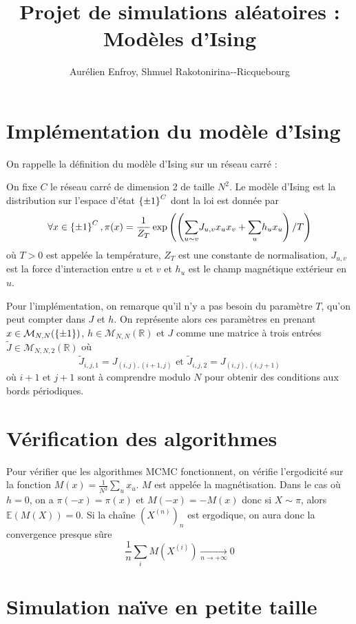 \documentclass[a4paper,11pt]{article}
\title{Projet de simulations aléatoires : Modèles d'Ising}
\author{Aurélien Enfroy, Shmuel Rakotonirina{-}-Ricquebourg}
\begin{document}
\maketitle

\section{Implémentation du modèle d'Ising}

On rappelle la définition du modèle d'Ising sur un réseau carré :
\begin{definition}
On fixe $C$ le réseau carré de dimension 2 de taille $N^2$. Le modèle d'Ising est la distribution sur l'espace d'état $\left\lbrace \pm 1 \right\rbrace^C$ dont la loi est donnée par
$$\forall x \in \left\lbrace \pm 1 \right\rbrace^C, \pi(x) = \frac{1}{Z_T} \exp \left(\left( \displaystyle{\sum_{u\sim v}^{}} J_{u,v} x_{u} x_{v} + \displaystyle{\sum_{u}^{}} h_{u} x_{u} \right)/T\right)$$
où $T>0$ est appelée la température, $Z_T$ est une constante de normalisation, $J_{u,v}$ est la force d'interaction entre $u$ et $v$ et $h_{u}$ est le champ magnétique extérieur en $u$.
\end{definition}

Pour l'implémentation, on remarque qu'il n'y a pas besoin du paramètre $T$, qu'on peut compter dans $J$ et $h$. On représente alors ces paramètres en prenant $x \in \mathcal M_{N,N}(\left\lbrace \pm 1 \right\rbrace)$, $h \in \mathcal M_{N,N}(\mathbb R)$ et $J$ comme une matrice à trois entrées $\tilde J \in \mathcal M_{N,N,2}(\mathbb R)$ où
$$\tilde J_{i,j,1} = J_{(i,j),(i+1,j)} \text{ et } \tilde J_{i,j,2} = J_{(i,j),(i,j+1)}$$
où $i+1$ et $j+1$ sont à comprendre modulo $N$ pour obtenir des conditions aux bords périodiques.

\section{Vérification des algorithmes}

Pour vérifier que les algorithmes MCMC fonctionnent, on vérifie l'ergodicité sur la fonction $M(x) = \frac{1}{N^2} \sum_u x_u$. $M$ est appelée la magnétisation. Dans le cas où $h = 0$, on a $\pi(-x) = \pi(x)$ et $M(-x) = -M(x)$ donc si $X \sim \pi$, alors $\mathbb E(M(X)) = 0$. Si la chaîne $(X^{(n)})_n$ est ergodique, on aura donc la convergence presque sûre
$$\frac{1}{n} \sum_i M(X^{(i)}) \xrightarrow[n \rightarrow +\infty]{} 0$$

\section{Simulation naïve en petite taille}
\end{document}

